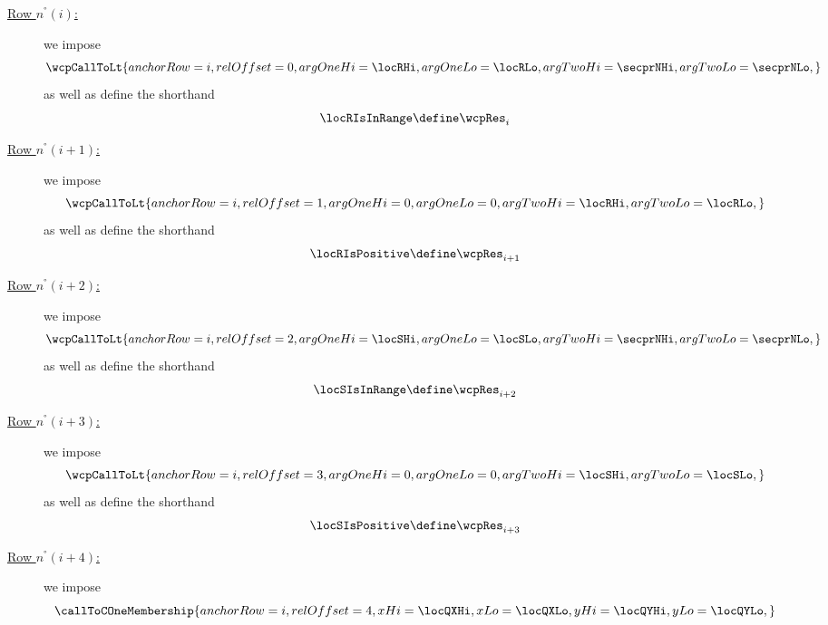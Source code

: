 \begin{description}
    \item[\underline{Row $n^°(i)$:}]
        we impose
        \[
            \wcpCallToLt {
                anchorRow = i        ,
                relOffset = 0        ,
                argOneHi  = \locRHi  ,
                argOneLo  = \locRLo  ,
                argTwoHi  = \secprNHi ,
                argTwoLo  = \secprNLo ,
            }
        \]
        as well as define the shorthand
        \[
            \locRIsInRange \define \wcpRes _{i}
        \]
    \item[\underline{Row $n^°(i + 1)$:}]
        we impose
        \[
            \wcpCallToLt {
                anchorRow = i       ,
                relOffset = 1       ,
                argOneHi  = 0       ,
                argOneLo  = 0       ,
                argTwoHi  = \locRHi ,
                argTwoLo  = \locRLo ,
            }
        \]
        as well as define the shorthand
        \[
            \locRIsPositive \define \wcpRes _{i + 1}
        \]
    \item[\underline{Row $n^°(i + 2)$:}]
        we impose
        \[
            \wcpCallToLt {
                anchorRow = i        ,
                relOffset = 2        ,
                argOneHi  = \locSHi  ,
                argOneLo  = \locSLo  ,
                argTwoHi  = \secprNHi ,
                argTwoLo  = \secprNLo ,
            }
        \]
        as well as define the shorthand
        \[
            \locSIsInRange  \define \wcpRes _{i + 2}
        \]
    \item[\underline{Row $n^°(i + 3)$:}]
        we impose
        \[
            \wcpCallToLt {
                anchorRow = i       ,
                relOffset = 3       ,
                argOneHi  = 0       ,
                argOneLo  = 0       ,
                argTwoHi  = \locSHi ,
                argTwoLo  = \locSLo ,
            }
        \]
        as well as define the shorthand
        \[
            \locSIsPositive \define \wcpRes _{i + 3}
        \]
        \item[\underline{Row $n^°(i+4)$:}]
        we impose
        \[
              \callToCOneMembership {
                  anchorRow        = i                      ,
                  relOffset        = 4                      ,
                  xHi              = \locQXHi               ,
                  xLo              = \locQXLo               ,
                  yHi              = \locQYHi               ,
                  yLo              = \locQYLo               ,
}\]
\end{description}
